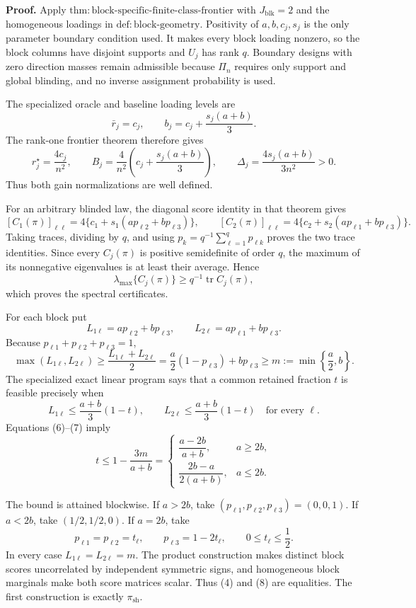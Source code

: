 \textbf{Proof.}
Apply \(\mathrm{thm:block\text{-}specific\text{-}finite\text{-}class\text{-}frontier}\) with \(J_{\mathrm{blk}}=2\) and the homogeneous loadings in \(\mathrm{def:block\text{-}geometry}\).  Positivity of \(a,b,c_j,s_j\) is the only parameter boundary condition used.  It makes every block loading nonzero, so the block columns have disjoint supports and \(U_j\) has rank \(q\).  Boundary designs with zero direction masses remain admissible because \(\Pi_n\) requires only support and global blinding, and no inverse assignment probability is used.

The specialized oracle and baseline loading levels are
\[
\bar r_j=c_j,
\qquad
b_j=c_j+\frac{s_j(a+b)}3.
\tag{1}
\]
The rank-one frontier theorem therefore gives
\[
r_j^\star=\frac{4c_j}{n^2},
\qquad
B_j=\frac4{n^2}\left(c_j+\frac{s_j(a+b)}3\right),
\qquad
\Delta_j=\frac{4s_j(a+b)}{3n^2}>0.
\tag{2}
\]
Thus both gain normalizations are well defined.

For an arbitrary blinded law, the diagonal score identity in that theorem gives
\[
[C_1(\pi)]_{\ell\ell}
=4\{c_1+s_1(ap_{\ell2}+bp_{\ell3})\},
\qquad
[C_2(\pi)]_{\ell\ell}
=4\{c_2+s_2(ap_{\ell1}+bp_{\ell3})\}.
\tag{3}
\]
Taking traces, dividing by \(q\), and using
\(p_k=q^{-1}\sum_{\ell=1}^q p_{\ell k}\) proves the two trace identities.  Since every \(C_j(\pi)\) is positive semidefinite of order \(q\), the maximum of its nonnegative eigenvalues is at least their average.  Hence
\[
\lambda_{\max}\{C_j(\pi)\}\ge q^{-1}\operatorname{tr}C_j(\pi),
\tag{4}
\]
which proves the spectral certificates.

For each block put
\[
L_{1\ell}=ap_{\ell2}+bp_{\ell3},
\qquad
L_{2\ell}=ap_{\ell1}+bp_{\ell3}.
\tag{5}
\]
Because \(p_{\ell1}+p_{\ell2}+p_{\ell3}=1\),
\[
\max(L_{1\ell},L_{2\ell})
\ge \frac{L_{1\ell}+L_{2\ell}}2
=\frac a2(1-p_{\ell3})+bp_{\ell3}
\ge m:=\min\left\{\frac a2,b\right\}.
\tag{6}
\]
The specialized exact linear program says that a common retained fraction \(t\) is feasible precisely when
\[
L_{1\ell}\le\frac{a+b}{3}(1-t),
\qquad
L_{2\ell}\le\frac{a+b}{3}(1-t)
\quad\text{for every }\ell.
\tag{7}
\]
Equations (6)--(7) imply
\[
t\le1-\frac{3m}{a+b}
=
\begin{cases}
\dfrac{a-2b}{a+b},&a\ge2b,\\[6pt]
\dfrac{2b-a}{2(a+b)},&a\le2b.
\end{cases}
\tag{8}
\]

The bound is attained blockwise.  If \(a>2b\), take \((p_{\ell1},p_{\ell2},p_{\ell3})=(0,0,1)\).  If \(a<2b\), take \((1/2,1/2,0)\).  If \(a=2b\), take
\[
p_{\ell1}=p_{\ell2}=t_\ell,
\qquad
p_{\ell3}=1-2t_\ell,
\qquad 0\le t_\ell\le\frac12.
\tag{9}
\]
In every case \(L_{1\ell}=L_{2\ell}=m\).  The product construction makes distinct block scores uncorrelated by independent symmetric signs, and homogeneous block marginals make both score matrices scalar.  Thus (4) and (8) are equalities.  The first construction is exactly \(\pi_{\mathrm{sh}}\).

